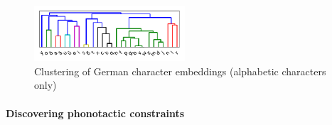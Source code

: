 
\begin{figure}
\includegraphics[width=0.50\textwidth]{figures/char-emb-clustering-output_output-phonetic-wiki-german-nospaces-bptt-910515909.pdf}
\caption{Clustering of German character embeddings (alphabetic characters only)}\label{fig:char-clustering}
\end{figure}



\paragraph{Discovering phonotactic constraints}
\label{sec:phonotactics}

